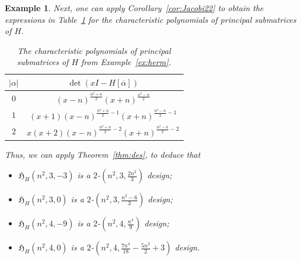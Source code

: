 \documentclass[11pt]{article}
\newtheorem{example}[theorem]{Example}
\begin{document}
\begin{example}
Next, one can apply Corollary~\ref{cor:Jacobi22} to obtain the expressions in Table~\ref{tab:charthird0} for the characteristic polynomials of principal submatrices of $H$.
\begin{table}[h!]
    \centering
    \begin{tabular}{c|c}
        $|\alpha|$ & $\det(xI-H[\overline \alpha])$  \\
        \hline
        $0$ & $(x-n)^{\frac{n^2+n}{2}}(x+n)^{\frac{n^2-n}{2}}$  \\
        $1$ & $(x+1)(x-n)^{\frac{n^2+n}{2}-1}(x+n)^{\frac{n^2-n}{2}-1}$  \\
        $2$ & $x(x+2)(x-n)^{\frac{n^2+n}{2}-2}(x+n)^{\frac{n^2-n}{2}-2}$  \\
    \end{tabular}
    \caption{The characteristic polynomials of principal submatrices of $H$ from Example~\ref{ex:herm}.}
    \label{tab:charthird0}
\end{table}

Thus, we can apply Theorem~\ref{thm:des}, to deduce that 
\begin{itemize}
    \item $\mathfrak H_{H}(n^2,3,-3)$ is a $2$-$(n^2,3,\frac{2 n^2}{3})$ design;
    \item $\mathfrak H_{H}(n^2,3,0)$ is a $2$-$(n^2,3,\frac{n^2-6}{3})$ design;
    \item $\mathfrak H_{H}(n^2,4,-9)$ is a $2$-$(n^2,4,\frac{n^4}{9})$ design;
    \item  $\mathfrak H_{H}(n^2,4,0)$ is a $2$-$(n^2,4,\frac{7 n^4}{18}-\frac{5 n^2}{2}+3)$ design.
\end{itemize}
 \end{example}
\end{document}
